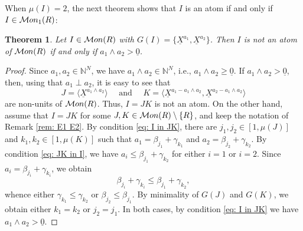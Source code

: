 \documentclass[10pt,a4paper]{amsart}
\newtheorem{theorem}{Theorem}[section]
\providecommand\Mon{{\mathcal{M}{\rm on}}}
\begin{document}
\bigskip


When $\mu(I)=2$, the next theorem shows that $I$ is an atom if and only if $I\in \Mon_1(R)$:

\begin{theorem}\label{thm: 2-gen}
    Let $I\in \Mon(R)$ with $G(I) = \{\underline X^{a_1},\underline X^{a_{2}}\}$. Then $I$ is not an atom of $\Mon(R)$ if and only if $a_1\wedge a_2>\underline 0$.
\end{theorem}
\begin{proof}
    Since $a_1,a_2\in\mathbb N^N$, we have $a_1\wedge a_2\in\mathbb N^N$, i.e., $a_1\wedge a_2\ge \underline 0$. If $a_1\wedge a_2 > \underline 0$, then, using that $a_1\perp a_2$, it is easy to see that
   \[J=\langle \underline X^{a_1\wedge a_2}\rangle \quad \text{ and }\quad K=\langle \underline X^{a_1-a_1\wedge a_2}, \underline X^{a_2-a_1\wedge a_2} \rangle \]
   are non-units of $\Mon(R)$. Thus, $I=JK$ is not an atom.
    On the other hand, assume that $I=JK$ for some $J,K\in\Mon(R)\setminus\{R\}$, and keep the notation of Remark \ref{rem: E1 E2}. By condition \ref{eq: I in JK}, there are $j_1,j_2\in [1,\mu(J)]$ and $k_1,k_2\in [1,\mu(K)]$ such that $a_1 = \beta_{j_1}+\gamma_{k_1}$ and $a_2=\beta_{j_2}+\gamma_{k_2}$. By condition \ref{eq: JK in I}, we have $a_i\le \beta_{j_1}+\gamma_{k_2}$ for either $i=1$ or $i=2$. Since $a_i=\beta_{j_i}+\gamma_{k_i}$, we obtain
    \[ \beta_{j_i}+\gamma_{k_i} \le \beta_{j_1}+\gamma_{k_2}, \]
    whence either $\gamma_{k_1}\le \gamma_{k_2}$ or $\beta_{j_2}\le \beta_{j_1}$. By minimality of $G(J)$ and $G(K)$, we obtain either $k_1=k_2$ or $j_2=j_1$. In both cases, by condition \ref{eq: I in JK} we have $a_1\wedge a_2>\underline 0$.
\end{proof}
\end{document}
